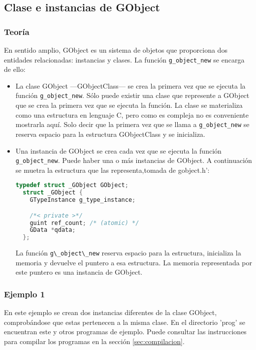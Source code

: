 \subsection{Clase e instancias de \textsf{GObject}} \label{subsec:clase_instancias_gobject}

\subsubsection{Teoría}
En sentido amplio, \textsf{GObject} es un sistema de objetos que proporciona dos entidades relacionadas: instancias y clases. La función \texttt{g\_object\_new} se
encarga de ello:
\begin{itemize}
  \tightlist
\item La clase \textsf{GObject} ---\textsf{GObjectClass}--- se crea la primera vez que
  se ejecuta la función \texttt{g\_object\_new}. Sólo puede existir una clase que
  represente a \textsf{GObject} que se crea la primera vez que se ejecuta la función.
  La clase se materializa como una estructura en lenguaje C, pero como es compleja no es
  conveniente mostrarla aquí. Solo decir que la primera vez que se llama a \texttt{g\_object\_new} se reserva espacio para la estructura \textsf{GObjectClass} y se
  inicializa.
\item Una instancia de \textsf{GObject} se crea cada vez que se ejecuta la función
  \texttt{g\_object\_new}. Puede haber una o más instancias de \textsf{GObject}.
  A continuación se muetra la estructura que las representa,tomada de \textsf{gobject.h}':
\begin{lstlisting}[language=C]
  typedef struct _GObject GObject;
  struct _GObject {
    GTypeInstance g_type_instance;

    /*< private >*/
    guint ref_count; /* (atomic) */
    GData *qdata;
  };
\end{lstlisting}
La función \passthrough{\lstinline!g\_object\_new!} reserva espacio para la estructura,
inicializa la memoria y devuelve el puntero a esa estructura. La memoria representada por este puntero es una instancia de \textsf{GObject}.
\end{itemize}

\subsubsection{Ejemplo 1}
En este ejemplo se crean dos instancias diferentes de la clase \textsf{GObject}, comprobándose que estas pertenecen a la misma clase. En el directorio '\textsf{prog}' se
encuentran este y otros programas de ejemplo. Puede consultar las instrucciones para
compilar los programas en la sección \ref{sec:compilacion}.

